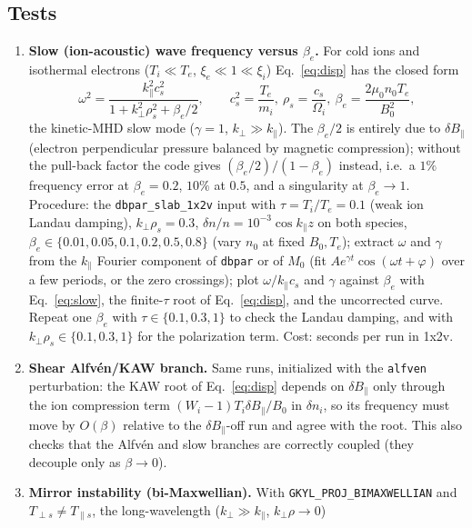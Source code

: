 \documentclass[11pt, letterpaper]{article}
\newcommand{\dBpar}{\delta B_\parallel}
\newcommand{\code}[1]{\texttt{#1}}
\begin{document}
\subsection{Tests}
\begin{enumerate}
  \item \textbf{Slow (ion-acoustic) wave frequency versus $\beta_e$.} For cold ions and
  isothermal electrons ($T_i\ll T_e$, $\xi_e\ll1\ll\xi_i$) Eq.~\eqref{eq:disp} has the closed form
  \begin{equation}
    \omega^2 = \frac{k_\parallel^2c_s^2}{1 + k_\perp^2\rho_s^2 + \beta_e/2},\qquad
    c_s^2=\frac{T_e}{m_i},\ \rho_s=\frac{c_s}{\Omega_i},\ \beta_e = \frac{2\mu_0n_0T_e}{B_0^2},
    \label{eq:slow}
  \end{equation}
  the kinetic-MHD slow mode ($\gamma=1$, $k_\perp\gg k_\parallel$). The $\beta_e/2$ is entirely
  due to $\dBpar$ (electron perpendicular pressure balanced by magnetic compression); without the
  pull-back factor the code gives $(\beta_e/2)/(1-\beta_e)$ instead, i.e.\ a $1\%$ frequency
  error at $\beta_e=0.2$, $10\%$ at $0.5$, and a singularity at $\beta_e\to1$. Procedure: the
  \code{dbpar\_slab\_1x2v} input with $\tau=T_i/T_e=0.1$ (weak ion Landau damping), $k_\perp\rho_s=0.3$,
  $\delta n/n=10^{-3}\cos k_\parallel z$ on both species, $\beta_e\in\{0.01,0.05,0.1,0.2,0.5,0.8\}$
  (vary $n_0$ at fixed $B_0,T_e$); extract $\omega$ and $\gamma$ from the $k_\parallel$ Fourier
  component of \code{dbpar} or of $M_0$ (fit $A e^{\gamma t}\cos(\omega t+\varphi)$ over a few
  periods, or the zero crossings); plot $\omega/k_\parallel c_s$ and $\gamma$ against $\beta_e$
  with Eq.~\eqref{eq:slow}, the finite-$\tau$ root of Eq.~\eqref{eq:disp}, and the uncorrected
  curve. Repeat one $\beta_e$ with $\tau\in\{0.1,0.3,1\}$ to check the Landau damping, and with
  $k_\perp\rho_s\in\{0.1,0.3,1\}$ for the polarization term. Cost: seconds per run in 1x2v.
  \item \textbf{Shear Alfv\'en/KAW branch.} Same runs, initialized with the \code{alfven}
  perturbation: the KAW root of Eq.~\eqref{eq:disp} depends on $\dBpar$ only through the ion
  compression term $(W_i-1)T_i\dBpar/B_0$ in $\delta n_i$, so its frequency must move by
  $O(\beta)$ relative to the $\dBpar$-off run and agree with the root. This also checks that the
  Alfv\'en and slow branches are correctly coupled (they decouple only as $\beta\to0$).
  \item \textbf{Mirror instability (bi-Maxwellian).} With \code{GKYL\_PROJ\_BIMAXWELLIAN} and
  $T_{\perp s}\neq T_{\parallel s}$, the long-wavelength ($k_\perp\gg k_\parallel$, $k_\perp\rho\to0$)

\end{enumerate}
\end{document}

